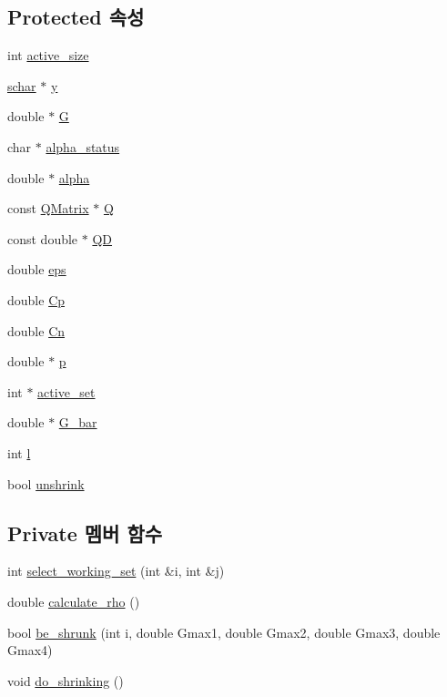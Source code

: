 \subsection*{Protected 속성}
\begin{DoxyCompactItemize}
\item 
int \hyperlink{class_solver_a06ba1b87b3749cc545e573151b7beca0}{active\+\_\+size}
\item 
\hyperlink{svm_8cpp_a0fd9ce9d735064461bebfe6037026093}{schar} $\ast$ \hyperlink{class_solver_a3acc1043d06dedf87f054ff3eea5c426}{y}
\item 
double $\ast$ \hyperlink{class_solver_ad8ab27068f2e045591970aae1201afe9}{G}
\item 
char $\ast$ \hyperlink{class_solver_a9fe653e04c43956d5fb86635651b0003}{alpha\+\_\+status}
\item 
double $\ast$ \hyperlink{class_solver_a00d7a7cefa2504d41c7db6cd7cc6b428}{alpha}
\item 
const \hyperlink{class_q_matrix}{Q\+Matrix} $\ast$ \hyperlink{class_solver_a2d3461718f0570bdc47f5dfb31d61e0a}{Q}
\item 
const double $\ast$ \hyperlink{class_solver_a7c7b7b1207983543855165e8eb249f2a}{Q\+D}
\item 
double \hyperlink{class_solver_a718333cc2c1d40abf9c292a788cba1e5}{eps}
\item 
double \hyperlink{class_solver_a2e45dbea8be469bf8247e14768549dd5}{Cp}
\item 
double \hyperlink{class_solver_a38d741d194839fb445f982dd78e0b97b}{Cn}
\item 
double $\ast$ \hyperlink{class_solver_a882cce072f56679880d409e3e73f7ae8}{p}
\item 
int $\ast$ \hyperlink{class_solver_a6382277606a9b3df3d2f0ac947e1cde3}{active\+\_\+set}
\item 
double $\ast$ \hyperlink{class_solver_a89e58cf39a0415c9032b8ec2f4575dcc}{G\+\_\+bar}
\item 
int \hyperlink{class_solver_a88832d45b6de977b1cbb2afd4c0e494c}{l}
\item 
bool \hyperlink{class_solver_a62ded1c184aeb28f8dee04eb4a10530a}{unshrink}
\end{DoxyCompactItemize}
\subsection*{Private 멤버 함수}
\begin{DoxyCompactItemize}
\item 
int \hyperlink{class_solver___n_u_a39577d8d09b1d04500c41a999dfd21e9}{select\+\_\+working\+\_\+set} (int \&i, int \&j)
\item 
double \hyperlink{class_solver___n_u_aa4514c004c2a398ae320c6c619f67c98}{calculate\+\_\+rho} ()
\item 
bool \hyperlink{class_solver___n_u_ab22738c68164e939d7d0d5de5a5b15f3}{be\+\_\+shrunk} (int i, double Gmax1, double Gmax2, double Gmax3, double Gmax4)
\item 
void \hyperlink{class_solver___n_u_a6670a539940f4efdc40d2c9e75a9da1b}{do\+\_\+shrinking} ()
\end{DoxyCompactItemize}
